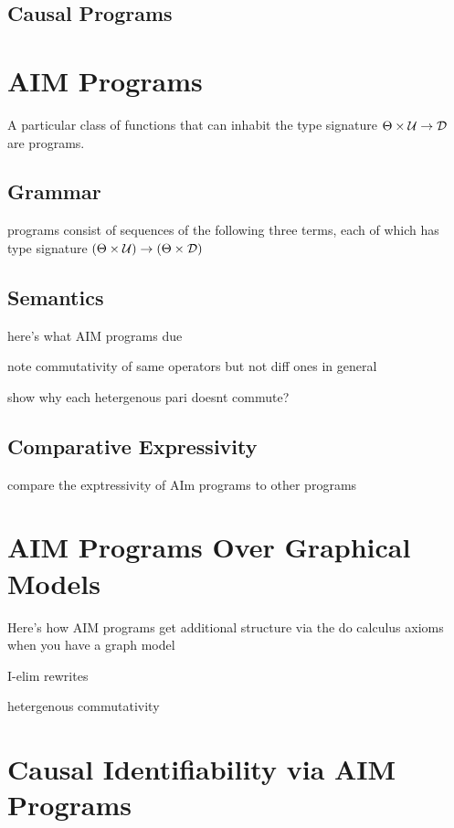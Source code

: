 \documentclass{article}
\begin{document}
\newcommand{\MU}{\Theta}
\newcommand{\U}{\mathcal{U}}

\subsection{Causal Programs}
\label{cp}

\section{AIM Programs}
\label{ap}

A particular class of functions that can inhabit the type signature $\MU \times \U \to \D$ are \AIM programs.

\subsection{Grammar}
\label{g}

\AIM programs consist of sequences of the following three terms, each of which has type signature $(\MU \times \U) \to (\MU \times \D)$

\subsection{Semantics}
\label{s}

here's what AIM programs due

note commutativity of same operators but not diff ones in general

show why each hetergenous pari doesnt commute?

\subsection{Comparative Expressivity}

compare the exptressivity of AIm programs to other programs


\section{AIM Programs Over Graphical Models}
\label{aposcm}

Here's how AIM programs get additional structure via the do calculus axioms when you have a graph model

I-elim rewrites

hetergenous commutativity


\section{Causal Identifiability via AIM Programs}
\label{civam}
\end{document}

